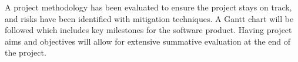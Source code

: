 \documentclass[12pt]{article}
\theoremstyle{plain}
\theoremstyle{definition}
\begin{document}
A project methodology has been evaluated to ensure the project stays on track, and risks have been identified with mitigation techniques. A Gantt chart will be followed which includes key milestones for the software product. Having project aims and objectives will allow for extensive summative evaluation at the end of the project.

\printbibliography

\clearpage\appendix
\end{document}
